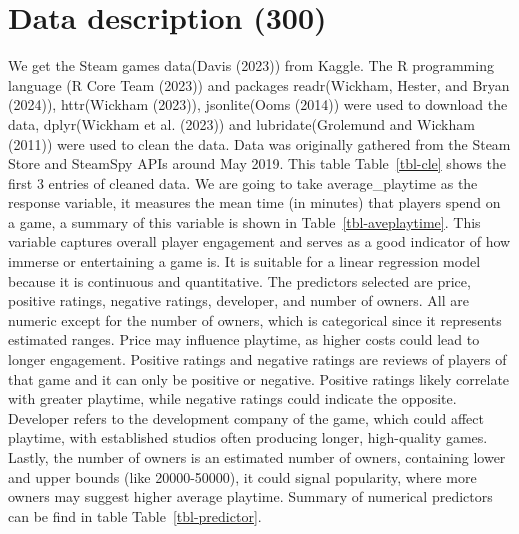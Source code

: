 \documentclass[
  letterpaper,
  DIV=11,
  numbers=noendperiod]{scrartcl}
\begin{document}
\hypertarget{data-description-300}{%
\section{Data description (300)}\label{data-description-300}}

We get the Steam games data(Davis (2023)) from Kaggle. The R programming
language (R Core Team (2023)) and packages readr(Wickham, Hester, and
Bryan (2024)), httr(Wickham (2023)), jsonlite(Ooms (2014)) were used to
download the data, dplyr(Wickham et al. (2023)) and lubridate(Grolemund
and Wickham (2011)) were used to clean the data. Data was originally
gathered from the Steam Store and SteamSpy APIs around May 2019. This
table Table~\ref{tbl-cle} shows the first 3 entries of cleaned data. We
are going to take average\_playtime as the response variable, it
measures the mean time (in minutes) that players spend on a game, a
summary of this variable is shown in Table~\ref{tbl-aveplaytime}. This
variable captures overall player engagement and serves as a good
indicator of how immerse or entertaining a game is. It is suitable for a
linear regression model because it is continuous and quantitative. The
predictors selected are price, positive ratings, negative ratings,
developer, and number of owners. All are numeric except for the number
of owners, which is categorical since it represents estimated ranges.
Price may influence playtime, as higher costs could lead to longer
engagement. Positive ratings and negative ratings are reviews of players
of that game and it can only be positive or negative. Positive ratings
likely correlate with greater playtime, while negative ratings could
indicate the opposite. Developer refers to the development company of
the game, which could affect playtime, with established studios often
producing longer, high-quality games. Lastly, the number of owners is an
estimated number of owners, containing lower and upper bounds (like
20000-50000), it could signal popularity, where more owners may suggest
higher average playtime. Summary of numerical predictors can be find in
table Table~\ref{tbl-predictor}.
\end{document}

